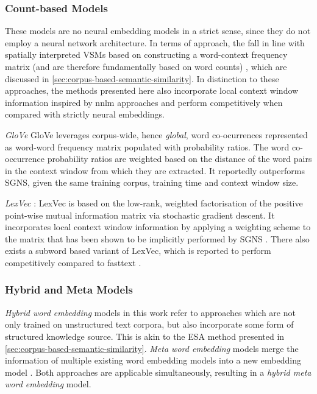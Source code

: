 \documentclass[11pt]{scrreprt}
\let\cite\parencite  %
\begin{document}
\subsubsection{Count-based Models}
These models are no neural embedding models in a strict sense, since they do not employ a neural network architecture. In terms of approach, the fall in line with spatially interpreted VSMs based on constructing a word-context frequency matrix (and are therefore fundamentally based on word counts) \cite{almeidaWordEmbeddingsSurvey2023, turneyFrequencyMeaningVector2010}, which are discussed in \cref{sec:corpus-based-semantic-similarity}. In distinction to these approaches, the methods presented here also incorporate local context window information inspired by \gls{nnlm} approaches and perform competitively when compared with strictly neural embeddings.

\textit{GloVe} \cite{penningtonGloVeGlobalVectors2014} GloVe leverages corpus-wide, hence \textit{global}, word co-ocurrences represented as word-word frequency matrix populated with probability ratios. The word co-occurrence probability ratios are weighted based on the distance of the word pairs in the context window from which they are extracted. It reportedly outperforms SGNS, given the same training corpus, training time and context window size.

\textit{LexVec} \cite{salleMatrixFactorizationUsing2016, salleEnhancingLexVecDistributed2016, salleWhyRoleNegative2019}: LexVec is based on the low-rank, weighted factorisation of the positive point-wise mutual information matrix via stochastic gradient descent. It incorporates local context window information by applying a weighting scheme to the matrix that has been shown to be implicitly performed by SGNS \cite{levyNeuralWordEmbedding2014}. There also exists a subword based variant of LexVec, which is reported to perform competitively compared to fasttext \cite{salleIncorporatingSubwordInformation2018}.


\subsubsection{Hybrid and Meta Models}
\textit{Hybrid word embedding} models in this work refer to approaches which are not only trained on unstructured text corpora, but also incorporate some form of structured knowledge source. This is akin to the ESA method presented in \cref{sec:corpus-based-semantic-similarity}. \textit{Meta word embedding} models merge the information of multiple existing word embedding models into a new embedding model \cite{bollegalaSurveyWordMetaEmbedding2022}. Both approaches are applicable simultaneously, resulting in a \textit{hybrid meta word embedding} model.
\end{document}
